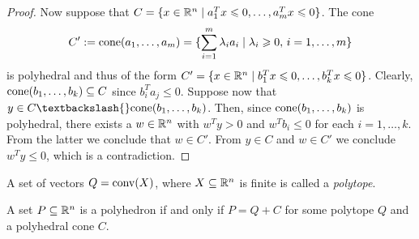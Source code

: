 \begin{proof}
  Now suppose that $C = \{ x \in \mathbb{R}^n \mid a_1^Tx\leqslant0,\ldots,a_m^Tx\leqslant0\}$.
  The cone
  \[ C' := \mathrm{cone}(a_1,\ldots,a_m) = \{ \sum_{i=1}^m \lambda_i a_i \mid
  \lambda_i\geqslant0,\,i=1,\ldots,m\} \]
  is polyhedral and thus of the form $C' = \{ x
  \in \mathbb{R}^n \mid b_1^Tx\leqslant0, \ldots,b_k^Tx\leqslant0\}$. Clearly,
  $\mathrm{cone}(b_1,\ldots,b_k)\subseteq C$  since $b_i^Ta_j\leq0$. Suppose now that $y \in
  C \textbackslash{} \cone(b_1,\ldots,b_k)$. Then, since $\mathrm{cone}(b_1,\ldots,b_k)$ is
  polyhedral, there exists a $w\in \mathbb{R}^n$ with $w^Ty>0$ and $w^Tb_i\leq0$
  for each $i=1,\ldots,k$. From the latter we conclude that $w \in
  C'$. From $y \in C$ and $w \in C'$ we conclude $w^Ty\leq0$, which is a contradiction.
\end{proof}

A set of vectors $Q = \operatorname{conv}(X)$, where $X\subseteq\mathbb{R}^n$ is finite is called a
\emph{polytope}. 

\begin{theorem}
  \label{po:thr:4}
  A set $P\subseteq\mathbb{R}^n$ is a polyhedron if and only if $P = Q + C$ for some
  polytope $Q$ and a polyhedral cone $C$. 
\end{theorem}

